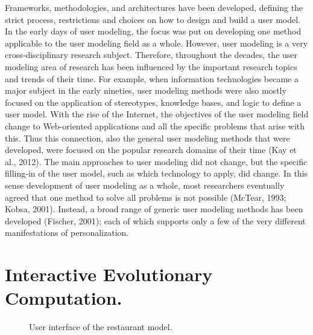 Frameworks,  methodologies, and architectures have been developed, defining the
strict process, restrictions and choices on how to design and build a user
model.  In the early days of user modeling, the focus was put on developing one
method applicable to the user modeling field as a whole. However, user modeling
is a very cross‐disciplinary research subject. Therefore, throughout the
decades, the user modeling area of research has been influenced by the important
research topics and trends of their time. For example, when information
technologies became a major subject in the early nineties, user modeling methods
were also mostly focused on the application of stereotypes, knowledge bases, and
logic to define a user model. With the rise of the Internet, the objectives of
the user modeling field change to Web-oriented applications and all the specific
problems that arise with this. Thus this connection,  also the general user
modeling methods that were developed, were focused on the popular research
domains of their time (Kay et al., 2012). The main approaches to user modeling
did not change, but the specific filling‐in of the user model, such as which
technology to apply, did change. In this sense development of user modeling as a
whole, most researchers eventually agreed that one method to solve all problems
is not possible (McTear, 1993; Kobsa, 2001). Instead, a broad range of  generic
user modeling methods has been developed (Fischer, 2001); each of which supports
only a few of the very different manifestations of personalization. 







\section{Interactive Evolutionary Computation.}
\begin{figure}
\captionsetup{justification=centering,margin=2cm}
\centering
\setlength\fboxsep{0pt}
\setlength\fboxrule{0.7pt}
\caption{User interface of the restaurant model.}
\label{fig:restaurantmodel}       
\end{figure}


